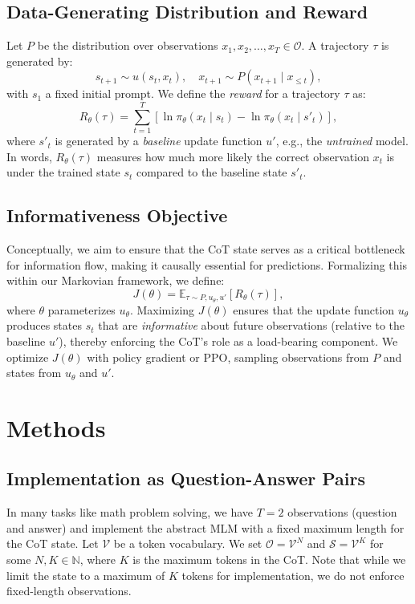 \documentclass{article} %
\begin{document}
\subsection{Data-Generating Distribution and Reward}

Let $P$ be the distribution over observations $x_1, x_2, \dots, x_T \in \mathcal{O}$. A trajectory $\tau$ is generated by:
\[
s_{t+1}\sim u(s_t, x_t), \quad x_{t+1}\sim P(x_{t+1}\mid x_{\le t}),
\]
with $s_1$ a fixed initial prompt. We define the \emph{reward} for a trajectory $\tau$ as:
\[
R_\theta(\tau)=\sum_{t=1}^T \left[\ln \pi_\theta(x_t\mid s_t)-\ln \pi_\theta(x_t\mid s'_t)\right],
\]
where $s'_t$ is generated by a \emph{baseline} update function $u'$, e.g., the \emph{untrained} model. In words, $R_\theta(\tau)$ measures how much more likely the correct observation $x_t$ is under the trained state $s_t$ compared to the baseline state $s'_t$.

\subsection{Informativeness Objective}

Conceptually, we aim to ensure that the CoT state serves as a critical bottleneck for information flow, making it causally essential for predictions. Formalizing this within our Markovian framework, we define:
\[
  J(\theta)=\mathbb{E}_{\tau \sim P,u_\theta,u'}\left[R_\theta(\tau)\right],
\]
where $\theta$ parameterizes $u_\theta$. Maximizing $J(\theta)$ ensures that the update function $u_\theta$ produces states $s_t$ that are \emph{informative} about future observations (relative to the baseline $u'$), thereby enforcing the CoT's role as a load-bearing component. We optimize $J(\theta)$ with policy gradient or PPO, sampling observations from $P$ and states from $u_\theta$ and $u'$.

\section{Methods}
\label{sec:method}

\subsection{Implementation as Question-Answer Pairs}
In many tasks like math problem solving, we have $T=2$ observations (question and answer) and implement the abstract MLM with a fixed maximum length for the CoT state. Let $\mathcal{V}$ be a token vocabulary. We set $\mathcal{O} = \mathcal{V}^N$ and $\mathcal{S} = \mathcal{V}^K$ for some $N, K \in \mathbb{N}$, where $K$ is the maximum tokens in the CoT. Note that while we limit the state to a maximum of $K$ tokens for implementation, we do not enforce fixed-length observations. 
\end{document}

